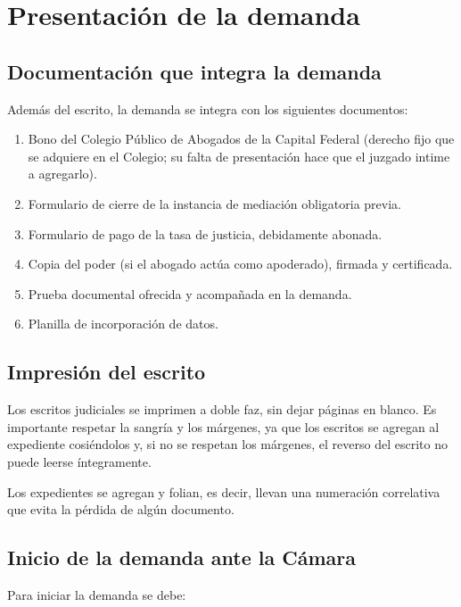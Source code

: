\documentclass[12pt,oneside]{book}
\begin{document}
\chapter{Presentación de la demanda}

\section{Documentación que integra la demanda}

Además del escrito, la demanda se integra con los siguientes documentos:

\begin{enumerate}
    \item Bono del Colegio Público de Abogados de la Capital Federal (derecho fijo que se adquiere en el Colegio; su falta de presentación hace que el juzgado intime a agregarlo).
    \item Formulario de cierre de la instancia de mediación obligatoria previa.
    \item Formulario de pago de la tasa de justicia, debidamente abonada.
    \item Copia del poder (si el abogado actúa como apoderado), firmada y certificada.
    \item Prueba documental ofrecida y acompañada en la demanda.
    \item Planilla de incorporación de datos.
\end{enumerate}

\section{Impresión del escrito}

Los escritos judiciales se imprimen a doble faz, sin dejar páginas en blanco. Es importante respetar la sangría y los márgenes, ya que los escritos se agregan al expediente cosiéndolos y, si no se respetan los márgenes, el reverso del escrito no puede leerse íntegramente.

\begin{note}
Los expedientes se agregan y folian, es decir, llevan una numeración correlativa que evita la pérdida de algún documento.
\end{note}

\section{Inicio de la demanda ante la Cámara}

Para iniciar la demanda se debe:
\end{document}
